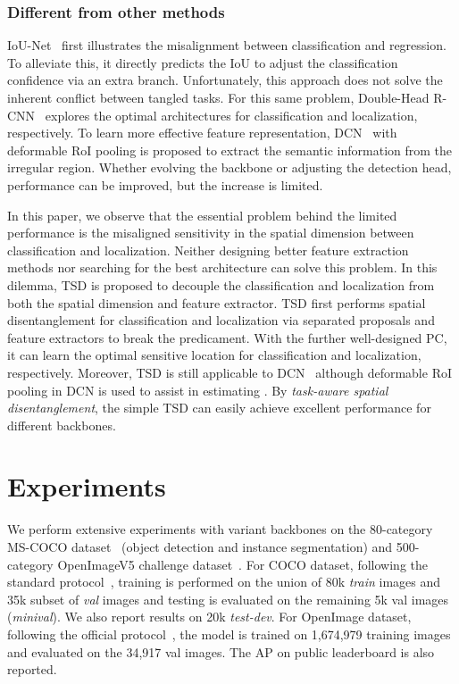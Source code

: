 \documentclass[10pt,twocolumn,letterpaper]{article}
\def \algfullname{\emph{task-aware spatial disentanglement}}
\def \algname{TSD}
\def \loss{PC}
\begin{document}
\subsubsection{Different from other methods}
IoU-Net~\cite{jiang2018acquisition} first illustrates the misalignment between classification and regression. To alleviate this, it directly predicts the IoU to adjust the classification confidence via an extra branch.
Unfortunately, this approach does not solve the inherent conflict between tangled tasks.
For this same problem, Double-Head R-CNN~\cite{wu2019rethinking} explores the optimal architectures for classification and localization, respectively.
To learn more effective feature representation, DCN~\cite{dai2017deformable} with deformable RoI pooling is proposed to extract the semantic information from the irregular region.
Whether evolving the backbone or adjusting the detection head,
performance can be improved, but the increase is limited.

In this paper, we observe that the essential problem behind the limited performance is the misaligned sensitivity in the spatial dimension between classification and localization.
Neither designing better feature extraction methods nor searching for the best architecture can solve this problem. 
In this dilemma, \algname{} is proposed to decouple the classification and localization from both the spatial dimension and feature extractor.
\algname{} first performs spatial disentanglement for classification and localization via separated proposals and feature extractors to break the predicament. With the further well-designed \loss{}, it can learn the optimal sensitive location for classification and localization, respectively.
Moreover, \algname{} is still applicable to DCN~\cite{dai2017deformable} although deformable RoI pooling in DCN is used to assist in estimating .
By \algfullname{}, the simple \algname{} can easily achieve excellent performance for different backbones.


\section{Experiments}\label{exp}
We perform extensive experiments with variant backbones on the 80-category MS-COCO dataset~\cite{lin2014microsoft} (object detection and instance segmentation) and 500-category OpenImageV5 challenge dataset~\cite{OpenImages}. 
For COCO dataset, following the standard protocol~\cite{lu2019grid}, training is performed on the union of 80k \textit{train} images and 35k subset of \textit{val} images and testing is evaluated on the remaining 5k val images (\textit{minival}). We also report results on 20k \textit{test-dev}.
For OpenImage dataset, following the official protocol~\cite{OpenImages}, the model is trained on 1,674,979 training images and evaluated on the 34,917 val images.
The AP on public leaderboard is also reported.
\end{document}
